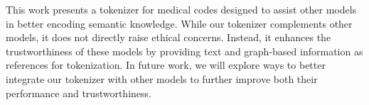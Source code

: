 This work presents a tokenizer for medical codes designed to assist other models in better encoding semantic knowledge.
While our tokenizer complements other models, it does not directly raise ethical concerns.
Instead, it enhances the trustworthiness of these models by providing text and graph-based information as references for tokenization.
In future work, we will explore ways to better integrate our tokenizer with other models to further improve both their performance and trustworthiness.
